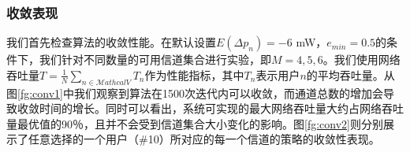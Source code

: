 \subsubsection{收敛表现}
我们首先检查算法的收敛性能。在默认设置$E(\Delta p_n)=-6$ mW，$e_{min}=0.5$的条件下，我们针对不同数量的可用信道集合进行实验，即$M=4,5,6$。我们使用网络吞吐量$T=\frac{1}{N}\sum_{n\in\mathcal{M}athcal{V}}T_n$作为性能指标，其中$T_n$表示用户$n$的平均吞吐量。从图\ref{fg:conv1}中我们观察到算法在1500次迭代内可以收敛，而通道总数的增加会导致收敛时间的增长。同时可以看出，系统可实现的最大网络吞吐量大约占网络吞吐量最优值的90％，且并不会受到信道集合大小变化的影响。图\ref{fg:conv2}则分别展示了任意选择的一个用户（\#10）所对应的每一个信道的策略的收敛性表现。


